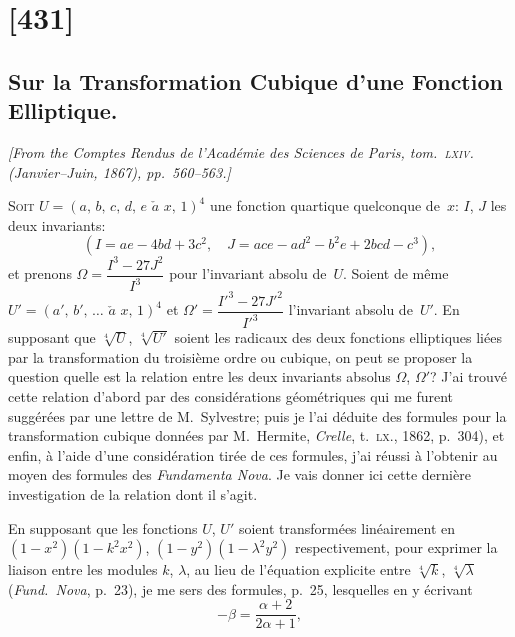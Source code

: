 \documentclass[11pt,a4paper]{article}
\theoremstyle{plain}
\theoremstyle{definition}
\begin{document}
\clearpage

\section{[431]}
\subsection{Sur la Transformation Cubique d'une Fonction Elliptique.}

\begin{center}
\textit{[From the Comptes Rendus de l'Acad\'emie des Sciences de Paris, tom.~\textsc{lxiv}.
(Janvier--Juin, 1867), pp.~560--563.]}
\end{center}

\textsc{Soit} $U = (a,\,b,\,c,\,d,\,e\,\,\check{a}\,\,x,\,1)^4$ une fonction quartique quelconque de~$x$: $I$, $J$ les
deux invariants:
\[
(I = ae - 4bd + 3c^2,\quad J = ace - ad^2 - b^2e + 2bcd - c^3),
\]
et prenons $\Omega = \dfrac{I^3 - 27J^2}{I^3}$ pour l'invariant absolu de~$U$.  Soient de m\^eme $U' = (a',\,b',\,\dots\,\,\check{a}\,\,x,\,1)^4$
et $\Omega' = \dfrac{I'^3 - 27J'^2}{I'^3}$ l'invariant absolu de~$U'$.  En supposant que $\sqrt[4]{U}$, $\sqrt[4]{U'}$ soient les
radicaux des deux fonctions elliptiques li\'ees par la transformation du troisi\`eme ordre
ou cubique, on peut se proposer la question quelle est la relation entre les deux
invariants absolus $\Omega$, $\Omega'$?  J'ai trouv\'e cette relation d'abord par des consid\'erations
g\'eom\'etriques qui me furent sugg\'er\'ees par une lettre de M.\ Sylvestre; puis je l'ai d\'eduite
des formules pour la transformation cubique donn\'ees par M.\ Hermite, \textit{Crelle}, t.~\textsc{lx}., 1862,
p.~304), et enfin, \`a l'aide d'une consid\'eration tir\'ee de ces formules, j'ai r\'eussi \`a
l'obtenir au moyen des formules des \textit{Fundamenta Nova}.  Je vais donner ici cette derni\`ere
investigation de la relation dont il s'agit.

En supposant que les fonctions $U$, $U'$ soient transform\'ees lin\'eairement en
$(1 - x^2)(1 - k^2x^2)$, $(1 - y^2)(1 - \lambda^2y^2)$ respectivement, pour exprimer la liaison entre les
modules $k$, $\lambda$, au lieu de l'\'equation explicite entre $\sqrt[4]{k}$, $\sqrt[4]{\lambda}$ (\textit{Fund.\ Nova}, p.~23), je
me sers des formules, p.~25, lesquelles en y \'ecrivant
\[
-\beta = \frac{\alpha + 2}{2\alpha + 1},
\]
\end{document}
